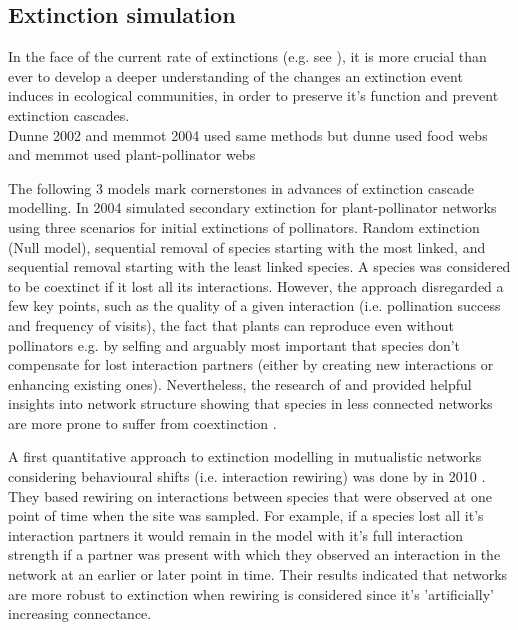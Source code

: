 \documentclass[12pt,a4paper]{article}
\begin{document}



\subsection{Extinction simulation}
	In the face of the current rate of extinctions (e.g. see \cite{IPBES2019}), it is more crucial than ever to develop a deeper understanding of the changes an extinction event induces in ecological communities, in order to preserve it's function and prevent extinction cascades.\\
	
Dunne 2002 and memmot 2004 used same methods but dunne used food webs and memmot used plant-pollinator webs	
	
	 The following 3 models mark cornerstones in advances of extinction cascade modelling. In 2004 \citeauthor{Memmott2004} simulated secondary extinction for plant-pollinator networks using three scenarios for initial extinctions of pollinators. Random extinction (Null model), sequential removal of species starting with the most linked, and sequential removal starting with the least linked species. A species was considered to be coextinct if it lost all its interactions. However, the approach disregarded a few key points, such as the quality of a given interaction (i.e. pollination success and frequency of visits), the fact that plants can reproduce even without pollinators e.g. by selfing and arguably most important that species don't compensate for lost interaction partners (either by creating new interactions or enhancing existing ones). Nevertheless, the research of \citeauthor{Dunne2002} and \citeauthor{Memmott2004} provided helpful insights into network structure showing that species in less connected networks are more prone to suffer from coextinction \parencite{Memmott2004, Dunne2002}. \par

A first quantitative approach to extinction modelling in mutualistic networks considering behavioural shifts (i.e. interaction rewiring) was done by \citeauthor{Kaiser-Bunbury2010} in 2010 \parencite{Kaiser-Bunbury2010}. They based rewiring on interactions between species that were observed at one point of time when the site was sampled. For example, if a species lost all it's interaction partners it would remain in the model with it's full interaction strength if a partner was present with which they observed an interaction in the network at an earlier or later point in time. Their results indicated that networks are more robust to extinction when rewiring is considered since it's 'artificially' increasing connectance. \par
\end{document}
